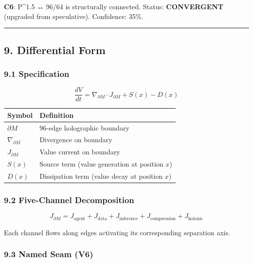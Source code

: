 \documentclass[
]{article}
\newcounter{none} %
\begin{document}
\textbf{C6}: P\^{}1.5 ↔ 96/64 is structurally connected. Status:
\textbf{CONVERGENT} (upgraded from speculative). Confidence: 35\%.

\begin{center}\rule{0.5\linewidth}{0.5pt}\end{center}

\subsection{9. Differential Form}\label{differential-form-1}

\subsubsection{9.1 Specification}\label{specification}

\[\frac{dV}{dt} = \nabla_{\partial M} \cdot J_{\partial M} + S(x) - D(x)\]

{\def\LTcaptype{none} %
\begin{longtable}[]{@{}ll@{}}
\toprule\noalign{}
Symbol & Definition \\
\midrule\noalign{}
\endhead
\bottomrule\noalign{}
\endlastfoot
\(\partial M\) & 96-edge holographic boundary \\
\(\nabla_{\partial M}\) & Divergence on boundary \\
\(J_{\partial M}\) & Value current on boundary \\
\(S(x)\) & Source term (value generation at position \(x\)) \\
\(D(x)\) & Dissipation term (value decay at position \(x\)) \\
\end{longtable}
}

\subsubsection{9.2 Five-Channel
Decomposition}\label{five-channel-decomposition}

\[J_{\partial M} = J_{\text{agent}} + J_{\text{data}} + J_{\text{inference}} + J_{\text{compression}} + J_{\text{holonic}}\]

Each channel flows along edges activating its corresponding separation
axis.

\subsubsection{9.3 Named Seam (V6)}\label{named-seam-v6}
\end{document}
